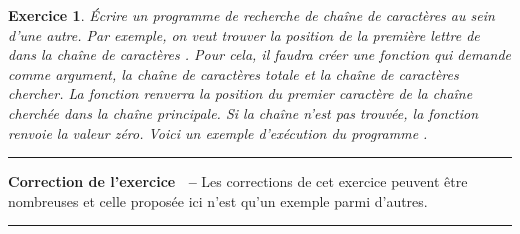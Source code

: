 \documentclass[a4paper]{article}
\newtheorem{Exo}{Exercice}
\newenvironment{Correction}{\par\tiny\blue\rule[1ex]{\textwidth}{1pt}\par\normalsize\textbf{Correction de l'exercice~\theExo{} -- }}{\par\tiny\blue\rule[1ex]{\textwidth}{1pt}\par}
\begin{document}
		\begin{Exo}
			Écrire un programme de recherche de chaîne de caractères au sein d'une autre.
			Par exemple, on veut trouver la position de la première lettre de  dans la chaîne de caractères .
			Pour cela, il faudra créer une fonction qui demande comme argument, la chaîne de caractères totale et la chaîne de caractères 
			 chercher.
			 La fonction renverra la position du premier caractère de la chaîne cherchée dans la chaîne principale.
			 Si la chaîne n'est pas trouvée, la fonction renvoie la valeur zéro.
			 Voici un exemple d'exécution du programme .
		\end{Exo}
		\begin{Correction}
			Les corrections de cet exercice peuvent être nombreuses et celle proposée ici n'est qu'un exemple parmi d'autres.
		\end{Correction}
\end{document}

